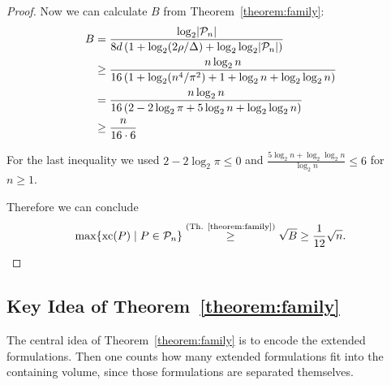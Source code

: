 \begin{proof}
  Now we can calculate $B$ from Theorem~\ref{theorem:family}:
  \begin{align*}
    B &= \frac{\log_2 \lvert\mathcal{P}_n\rvert}{8d \left(1 + \log_2 (2\rho/\Delta) + \log_2\log_2 \lvert\mathcal{P}_n\rvert \right)}\\
    &\geq \frac{n \log_2 n}{16 \left(1 + \log_2 (n^4 / \pi^2) + 1 + \log_2 n + \log_2 \log_2 n \right)}\\
    &= \frac{n \log_2 n}{16 \left(2 - 2 \log_2 \pi + 5 \log_2 n + \log_2 \log_2 n \right)}\\
    &\geq \frac{n}{16 \cdot 6}
  \end{align*}

  For the last inequality we used $2 - 2 \log_2 \pi \leq 0$ and $\frac{5 \log_2 n + \log_2 \log_2 n}{\log_2 n} \leq 6$ for $n \geq 1$.

  Therefore we can conclude $$\max \{\operatorname{xc}(P) \mid P \in \mathcal{P}_n\} \stackrel{\text{(Th. \ref{theorem:family})}}{\geq} \sqrt{B} \geq \frac{1}{12} \sqrt{n} .$$
\end{proof}



\subsection{Key Idea of Theorem~\ref{theorem:family}}

The central idea of Theorem~\ref{theorem:family} is to encode the extended formulations. Then one counts how many extended formulations fit into the containing volume, since those formulations are separated themselves.

